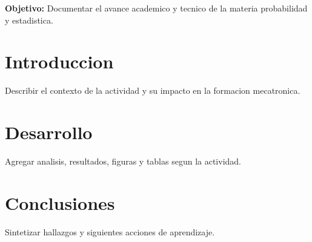 \documentclass[spanish,letterpaper,oneside]{article}
\begin{document}
\templatePortrait
\templatePagecfg
\onehalfspacing

\begin{abstractd}
\textbf{Objetivo:} Documentar el avance academico y tecnico de la materia probabilidad y estadistica.
\end{abstractd}

\templateIndex
\templateFinalcfg

\section{Introduccion}
Describir el contexto de la actividad y su impacto en la formacion mecatronica.

\section{Desarrollo}
Agregar analisis, resultados, figuras y tablas segun la actividad.

\section{Conclusiones}
Sintetizar hallazgos y siguientes acciones de aprendizaje.



\end{document}
